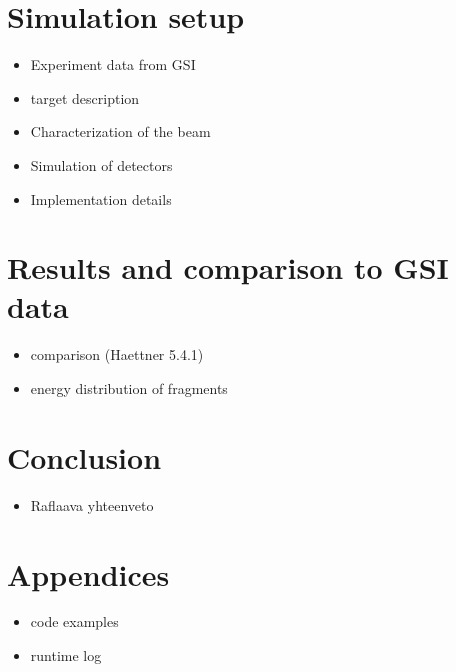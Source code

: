 \section{Simulation setup}
\begin{itemize}
\item Experiment data from GSI
\item target description
\item Characterization of the beam
\item Simulation of detectors
\item Implementation details
\end{itemize}

\section{Results and comparison to GSI data}
\begin{itemize}
\item comparison (Haettner 5.4.1)
\item energy distribution of fragments
\end{itemize}

\section{Conclusion}
\begin{itemize}
\item Raflaava yhteenveto
\end{itemize}

\section{Appendices}
\begin{itemize}
\item code examples
\item runtime log
\end{itemize}





  


\else

\fi